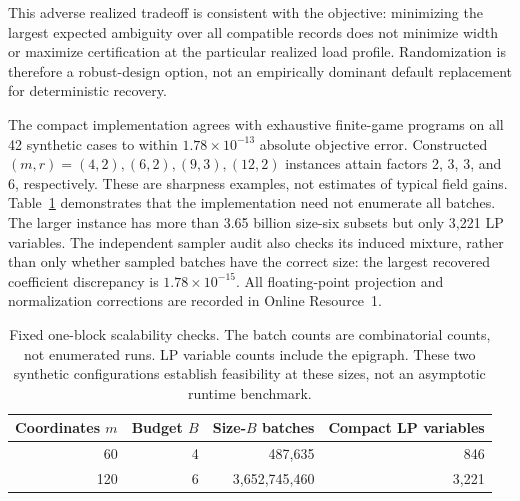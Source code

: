 \documentclass[12pt]{article}
\begin{document}
This adverse realized tradeoff is consistent with the objective: minimizing
the largest expected ambiguity over all compatible records does not
minimize width or maximize certification at the particular realized load
profile. Randomization is therefore a robust-design option, not an
empirically dominant default replacement for deterministic recovery.

The compact implementation agrees with exhaustive finite-game programs on
all 42 synthetic cases to within $1.78\times10^{-13}$ absolute objective
error. Constructed $(m,r)=(4,2),(6,2),(9,3),(12,2)$ instances attain factors
2, 3, 3, and 6, respectively. These are sharpness examples, not estimates
of typical field gains. Table~\ref{tab:compact-scale} demonstrates that the
implementation need not enumerate all batches. The larger instance has
more than 3.65 billion size-six subsets but only 3,221 LP variables.
The independent sampler audit also checks its induced mixture, rather than
only whether sampled batches have the correct size: the largest recovered
coefficient discrepancy is $1.78\times10^{-15}$. All floating-point
projection and normalization corrections are recorded in Online Resource~1.

\begin{table}[htbp]\centering\small
\caption{Fixed one-block scalability checks. The batch counts are combinatorial
counts, not enumerated runs. LP variable counts include the epigraph. These
two synthetic configurations establish feasibility at these sizes, not an
asymptotic runtime benchmark.}\label{tab:compact-scale}
\begin{tabular}{rrrr}\toprule
Coordinates $m$&Budget $B$&Size-$B$ batches&Compact LP variables\\\midrule
60 & 4 & 487,635 & 846 \\
120 & 6 & 3,652,745,460 & 3,221 \\
\bottomrule\end{tabular}\end{table}
\end{document}
